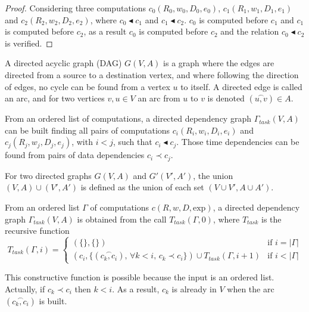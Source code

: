 \begin{proof}
Considering three computations $c_0(R_0,w_0,D_0,e_0)$, $c_1(R_1,w_1,D_1,e_1)$ and $c_2(R_2,w_2,D_2,e_2)$, where $c_0 \blacktriangleleft c_1$ and $c_1 \blacktriangleleft c_2$. $c_0$ is computed before $c_1$ and $c_1$ is computed before $c_2$, as a result $c_0$ is computed before $c_2$ and the relation $c_0 \blacktriangleleft c_2$ is verified. 
\end{proof}

\begin{mydef}
A directed acyclic graph (DAG) $G(V,A)$ is a graph where the edges are directed from a source to a destination vertex, and where following the direction of edges, no cycle can be found from a vertex $u$ to itself. A directed edge is called an arc, and for two vertices $v,u \in V$ an arc from $u$ to $v$ is denoted $(\overset{\frown}{u,v}) \in A$.
\end{mydef}

From an ordered list of computations, a directed dependency graph $\Gamma_{task}(V,A)$ can be built finding all pairs of computations $c_i(R_i,w_i,D_i,e_i)$ and $c_j(R_j,w_j,D_j,e_j)$, with $i<j$, such that $c_i \blacktriangleleft c_j$. Those time dependencies can be found from pairs of data dependencies $c_i \prec c_j$.

\begin{mydef}
For two directed graphs $G(V,A)$ and $G'(V',A')$, the union $(V,A)\cup (V',A')$ is defined as the union of each set $(V\cup V', A \cup A')$.
\end{mydef}

\begin{mydef}
From an ordered list $\Gamma$ of computations $c(R,w,D,\text{exp})$, a directed dependency graph $\Gamma_{task}(V,A)$ is obtained from the call $T_{task}(\Gamma,0)$, where $T_{task}$ is the recursive function
\begin{equation*}
T_{task}(\Gamma,i) = 
\begin{cases} 	(\{\},\{\}) & \mbox{if }i=|\Gamma|\\
				(c_i, \{(\overset{\frown}{c_k,c_i})\mbox{, }\forall k < i \mbox{, } c_k\prec c_i \})\cup T_{task}(\Gamma,i+1) & \mbox{if }i<|\Gamma|
\end{cases}
\end{equation*}
\end{mydef}

This constructive function is possible because the input is an ordered list. Actually, if $c_k\prec c_i$ then $k<i$. As a result, $c_k$ is already in $V$ when the arc $(\overset{\frown}{c_k,c_i})$ is built. 

